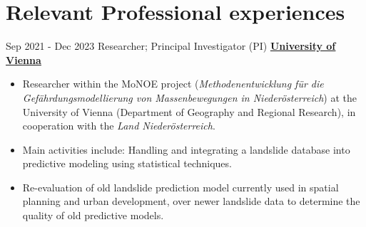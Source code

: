 \documentclass[letterpaper]{twentysecondcv} %
\begin{document}
\makeprofile %
 

\section{Relevant Professional experiences}

\begin{twenty} %
\twentyitem
    	{Sep 2021 -}
		{Dec 2023}
        {Researcher; Principal Investigator (PI) \color{black}} 
        {\href{https://geographie.univie.ac.at/arbeitsgruppen/engage-geomorphologische-systeme-und-risikoforschung/}{\normalsize  \textbf{\underline{University of Vienna}}}}
        {}
        {\begin{itemize}
        
        \item Researcher within the MoNOE project (\textit{Methodenentwicklung für die Gefährdungsmodellierung von Massenbewegungen in Niederösterreich}) at the University of Vienna (Department of Geography and Regional Research), in cooperation with the \textit{Land Niederösterreich}.
        \item Main activities include: Handling and integrating a landslide database into predictive modeling using statistical techniques. 
        \item Re-evaluation of old landslide prediction model currently used in spatial planning and urban development, over newer landslide data to determine the quality of old predictive models.\\
                 
        
         \hspace{2mm}
         \hspace{2mm}
          \hspace{2mm}  \hspace{2mm} 
        \end{itemize}}\\
        



\end{twenty}
\end{document}
